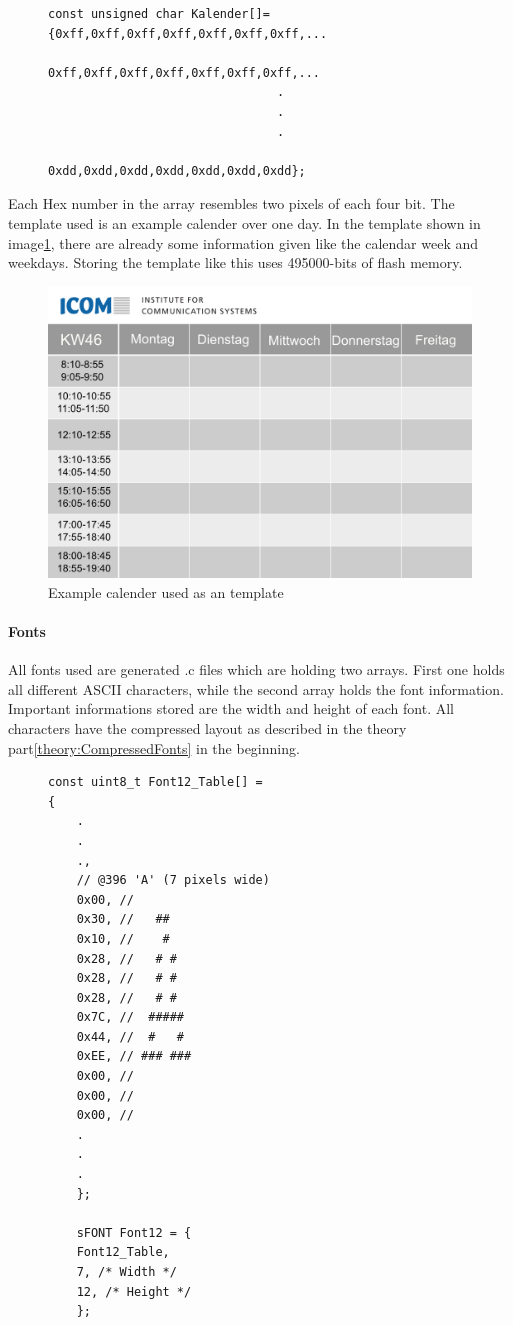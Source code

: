 \begin{figure}[H]
	\begin{lstlisting}
const unsigned char Kalender[]={0xff,0xff,0xff,0xff,0xff,0xff,0xff,...
								0xff,0xff,0xff,0xff,0xff,0xff,0xff,...
								.
								.
								.
								0xdd,0xdd,0xdd,0xdd,0xdd,0xdd,0xdd};
	\end{lstlisting}
\end{figure}
Each Hex number in the array resembles two pixels of each four bit. The template used is an example calender over one day. In the template shown in image\ref{software:kalender}, there are already some information given like the calendar week and weekdays. Storing the template like this uses 495000-bits of flash memory. 
\begin{figure}[H]
	\centering
	\includegraphics[height=0.6\textwidth]{4-development/software/graphics/Kalender.png}
	\caption{Example calender used as an template\label{software:kalender}}
\end{figure}


\paragraph{Fonts}
All fonts used are generated .c files which are holding two arrays. First one holds all different ASCII characters, while the second array holds the font information. Important informations stored are the width and height of each font. All characters have the compressed layout as described in the theory part\ref{theory:CompressedFonts} in the beginning.
\begin{figure}[H]
	\begin{lstlisting}
const uint8_t Font12_Table[] = 
{
	.
	.
	.,
	// @396 'A' (7 pixels wide)
	0x00, //        
	0x30, //   ##   
	0x10, //    #   
	0x28, //   # #  
	0x28, //   # #  
	0x28, //   # #  
	0x7C, //  ##### 
	0x44, //  #   # 
	0xEE, // ### ###
	0x00, //        
	0x00, //        
	0x00, // 
	.
	.
	. 
	};
	
	sFONT Font12 = {
	Font12_Table,
	7, /* Width */
	12, /* Height */
	};
	\end{lstlisting}
\end{figure}

